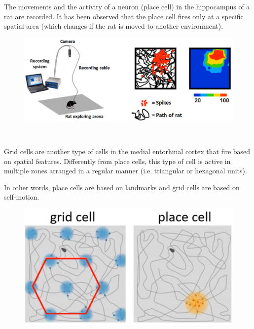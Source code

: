\begin{description}
        \begin{casestudy}
            The movements and the activity of a neuron (place cell) in the hippocampus of a rat are recorded.
            It has been observed that the place cell fires only at a specific spatial area (which changes if the rat is moved to another environment).
            \begin{figure}[H]
                \centering
                \includegraphics[width=0.55\linewidth]{./img/hippocampus_replay1.png}
            \end{figure}

            \indenttbox
            \begin{remark}
                \phantom{}\\[0.5em]
                \begin{minipage}{0.6\linewidth}
                    Grid cells are another type of cells in the medial entorhinal cortex that fire based on spatial features.
                    Differently from place cells, this type of cell is active in multiple zones arranged in a regular manner (i.e. triangular or hexagonal units).
    
                    In other words, place cells are based on landmarks and grid cells are based on self-motion.
                    
                \end{minipage}
                \begin{minipage}{0.3\linewidth}
                    \begin{figure}[H]
                        \centering
                        \includegraphics[width=0.9\linewidth]{./img/grid_place_cell.png}
                    \end{figure}
                \end{minipage}


\end{remark}
\end{casestudy}
\end{description}
